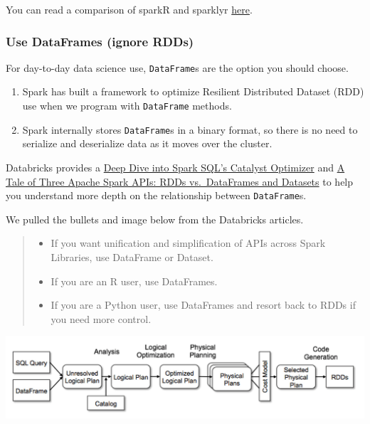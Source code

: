 \documentclass[
  letterpaper,
  DIV=11,
  numbers=noendperiod]{scrreprt}
\providecommand{\tightlist}{%
  \setlength{\itemsep}{0pt}\setlength{\parskip}{0pt}}\usepackage{longtable,booktabs,array}
\begin{document}
You can read a comparison of sparkR and sparklyr
\href{https://developpaper.com/deep-comparative-data-science-toolbox-sparkr-vs-sparklyr/}{here}.

\hypertarget{use-dataframes-ignore-rdds}{%
\subsubsection{Use DataFrames (ignore
RDDs)}\label{use-dataframes-ignore-rdds}}

For day-to-day data science use, \texttt{DataFrame}s are the option you
should choose.

\begin{enumerate}
\def\labelenumi{\arabic{enumi}.}
\tightlist
\item
  Spark has built a framework to optimize Resilient Distributed Dataset
  (RDD) use when we program with \texttt{DataFrame} methods.
\item
  Spark internally stores \texttt{DataFrame}s in a binary format, so
  there is no need to serialize and deserialize data as it moves over
  the cluster.
\end{enumerate}

Databricks provides a
\href{https://databricks.com/blog/2015/04/13/deep-dive-into-spark-sqls-catalyst-optimizer.html}{Deep
Dive into Spark SQL's Catalyst Optimizer} and
\href{https://databricks.com/blog/2016/07/14/a-tale-of-three-apache-spark-apis-rdds-dataframes-and-datasets.html}{A
Tale of Three Apache Spark APIs: RDDs vs.~DataFrames and Datasets} to
help you understand more depth on the relationship between
\texttt{DataFrame}s.

We pulled the bullets and image below from the Databricks articles.

\begin{quote}
\begin{itemize}
\tightlist
\item
  If you want unification and simplification of APIs across Spark
  Libraries, use DataFrame or Dataset.
\item
  If you are an R user, use DataFrames.
\item
  If you are a Python user, use DataFrames and resort back to RDDs if
  you need more control.
\end{itemize}
\end{quote}

\includegraphics{./img/spark_sql_dataframe_rdd.png}
\end{document}
